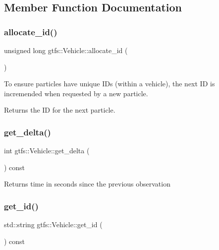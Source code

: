 \subsection{Member Function Documentation}
\mbox{\label{classgtfs_1_1Vehicle_aa9087e973a9821f384ec47f51bdcedc7}} 
\subsubsection{\texorpdfstring{allocate\+\_\+id()}{allocate\_id()}}
{\footnotesize\ttfamily unsigned long gtfs\+::\+Vehicle\+::allocate\+\_\+id (\begin{DoxyParamCaption}{ }\end{DoxyParamCaption})}

To ensure particles have unique ID\textquotesingle{}s (within a vehicle), the next ID is incremended when requested by a new particle.

\begin{DoxyReturn}{Returns}
the ID for the next particle. 
\end{DoxyReturn}
\mbox{\label{classgtfs_1_1Vehicle_a23c0a191559e4066423d5f3cbfb70b46}} 
\subsubsection{\texorpdfstring{get\+\_\+delta()}{get\_delta()}}
{\footnotesize\ttfamily int gtfs\+::\+Vehicle\+::get\+\_\+delta (\begin{DoxyParamCaption}{ }\end{DoxyParamCaption}) const}

\begin{DoxyReturn}{Returns}
time in seconds since the previous observation 
\end{DoxyReturn}
\mbox{\label{classgtfs_1_1Vehicle_a6b388986c9ed4af1eb86f13a3d2de8e0}} 
\subsubsection{\texorpdfstring{get\+\_\+id()}{get\_id()}}
{\footnotesize\ttfamily std\+::string gtfs\+::\+Vehicle\+::get\+\_\+id (\begin{DoxyParamCaption}{ }\end{DoxyParamCaption}) const}

